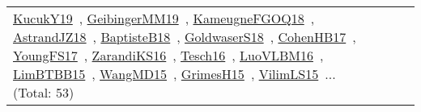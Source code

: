 {\begin{longtable}{lp{3cm}>{\raggedright\arraybackslash}p{6cm}>{\raggedright\arraybackslash}p{6cm}>{\raggedright\arraybackslash}p{8cm}}
\href{works/KucukY19.pdf}{KucukY19}~\cite{KucukY19}, \href{works/GeibingerMM19.pdf}{GeibingerMM19}~\cite{GeibingerMM19}, \href{works/KameugneFGOQ18.pdf}{KameugneFGOQ18}~\cite{KameugneFGOQ18}, \href{works/AstrandJZ18.pdf}{AstrandJZ18}~\cite{AstrandJZ18}, \href{works/BaptisteB18.pdf}{BaptisteB18}~\cite{BaptisteB18}, \href{works/GoldwaserS18.pdf}{GoldwaserS18}~\cite{GoldwaserS18}, \href{works/CohenHB17.pdf}{CohenHB17}~\cite{CohenHB17}, \href{works/YoungFS17.pdf}{YoungFS17}~\cite{YoungFS17}, \href{works/ZarandiKS16.pdf}{ZarandiKS16}~\cite{ZarandiKS16}, \href{works/Tesch16.pdf}{Tesch16}~\cite{Tesch16}, \href{works/LuoVLBM16.pdf}{LuoVLBM16}~\cite{LuoVLBM16}, \href{works/LimBTBB15.pdf}{LimBTBB15}~\cite{LimBTBB15}, \href{works/WangMD15.pdf}{WangMD15}~\cite{WangMD15}, \href{works/GrimesH15.pdf}{GrimesH15}~\cite{GrimesH15}, \href{works/VilimLS15.pdf}{VilimLS15}~\cite{VilimLS15}... (Total: 53)\\
\end{longtable}
}

